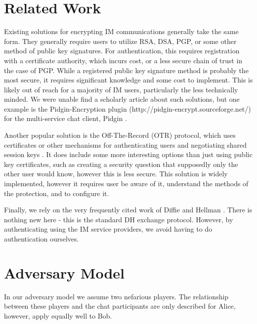\documentclass[twoside,10pt]{article}
\begin{document}
\begin{multicols}{2}
\section{Related Work}
Existing solutions for encrypting IM communications generally take the same form.  They generally require users to utilize RSA, DSA, PGP, or some other method of public key signatures.  For authentication, this requires registration with a certificate authority, which incurs cost, or a less secure chain of trust in the case of PGP.  While a registered public key signature method is probably the most secure, it requires significant knowledge and some cost to implement.  This is likely out of reach for a majority of IM users, particularly the less technically minded.  We were unable find a scholarly article about such solutions, but one example is the Pidgin-Encryption plugin (http://pidgin-encrypt.sourceforge.net/) for the multi-service chat client, Pidgin \cite{PidginEncryption}.  

Another popular solution is the Off-The-Record (OTR) protocol, which uses certificates or other mechanisms for authenticating users and negotiating shared session keys \cite{DiRaimondo:2005:SOM:1102199.1102216}.  It does include some more interesting options than just using public key certificates, such as creating a security question that supposedly only the other user would know, however this is less secure.  This solution is widely implemented, however it requires user be aware of it, understand the methods of the protection, and to configure it.

Finally, we rely on the very frequently cited work of Diffie and Hellman \cite{diffie1976new}.  There is nothing new here - this is the standard DH exchange protocol.  However, by authenticating using the IM service providers, we avoid having to do authentication ourselves.

\section{Adversary Model}
In our adversary model we assume two nefarious players.  The relationship between these players and the chat participants are only described for Alice, however, apply equally well to Bob.


\end{multicols}
\end{document}

